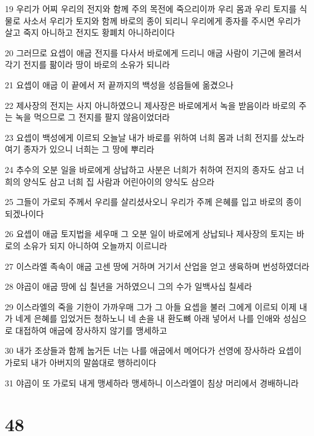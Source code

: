 \par 19 우리가 어찌 우리의 전지와 함께 주의 목전에 죽으리이까 우리 몸과 우리 토지를 식물로 사소서 우리가 토지와 함께 바로의 종이 되리니 우리에게 종자를 주시면 우리가 살고 죽지 아니하고 전지도 황폐치 아니하리이다
\par 20 그러므로 요셉이 애굽 전지를 다사서 바로에게 드리니 애굽 사람이 기근에 몰려서 각기 전지를 팖이라 땅이 바로의 소유가 되니라
\par 21 요셉이 애굽 이 끝에서 저 끝까지의 백성을 성읍들에 옮겼으나
\par 22 제사장의 전지는 사지 아니하였으니 제사장은 바로에게서 녹을 받음이라 바로의 주는 녹을 먹으므로 그 전지를 팔지 않음이었더라
\par 23 요셉이 백성에게 이르되 오늘날 내가 바로를 위하여 너희 몸과 너희 전지를 샀노라 여기 종자가 있으니 너희는 그 땅에 뿌리라
\par 24 추수의 오분 일을 바로에게 상납하고 사분은 너희가 취하여 전지의 종자도 삼고 너희의 양식도 삼고 너희 집 사람과 어린아이의 양식도 삼으라
\par 25 그들이 가로되 주께서 우리를 살리셨사오니 우리가 주께 은혜를 입고 바로의 종이 되겠나이다
\par 26 요셉이 애굽 토지법을 세우매 그 오분 일이 바로에게 상납되나 제사장의 토지는 바로의 소유가 되지 아니하여 오늘까지 이르니라
\par 27 이스라엘 족속이 애굽 고센 땅에 거하며 거기서 산업을 얻고 생육하며 번성하였더라
\par 28 야곱이 애굽 땅에 십 칠년을 거하였으니 그의 수가 일백사십 칠세라
\par 29 이스라엘의 죽을 기한이 가까우매 그가 그 아들 요셉을 불러 그에게 이르되 이제 내가 네게 은혜를 입었거든 청하노니 네 손을 내 환도뼈 아래 넣어서 나를 인애와 성심으로 대접하여 애굽에 장사하지 않기를 맹세하고
\par 30 내가 조상들과 함께 눕거든 너는 나를 애굽에서 메어다가 선영에 장사하라 요셉이 가로되 내가 아버지의 말씀대로 행하리이다
\par 31 야곱이 또 가로되 내게 맹세하라 맹세하니 이스라엘이 침상 머리에서 경배하니라

\chapter{48}

